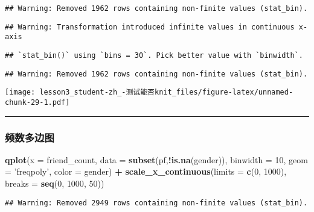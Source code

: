 \documentclass[]{article}
\newenvironment{Shaded}{\begin{snugshade}}{\end{snugshade}}
\newcommand{\DataTypeTok}[1]{\textcolor[rgb]{0.13,0.29,0.53}{#1}}
\newcommand{\DecValTok}[1]{\textcolor[rgb]{0.00,0.00,0.81}{#1}}
\newcommand{\KeywordTok}[1]{\textcolor[rgb]{0.13,0.29,0.53}{\textbf{#1}}}
\newcommand{\NormalTok}[1]{#1}
\newcommand{\OperatorTok}[1]{\textcolor[rgb]{0.81,0.36,0.00}{\textbf{#1}}}
\newcommand{\StringTok}[1]{\textcolor[rgb]{0.31,0.60,0.02}{#1}}
\begin{document}
\begin{verbatim}
## Warning: Removed 1962 rows containing non-finite values (stat_bin).
\end{verbatim}

\begin{verbatim}
## Warning: Transformation introduced infinite values in continuous x-axis
\end{verbatim}

\begin{verbatim}
## `stat_bin()` using `bins = 30`. Pick better value with `binwidth`.
\end{verbatim}

\begin{verbatim}
## Warning: Removed 1962 rows containing non-finite values (stat_bin).
\end{verbatim}

\texttt{[image: lesson3\_student-zh\_-测试能否knit\_files/figure-latex/unnamed-chunk-29-1.pdf]}

\begin{center}\rule{0.5\linewidth}{\linethickness}\end{center}

\subsubsection{频数多边图}

\begin{Shaded}
\begin{Highlighting}[]
\KeywordTok{qplot}\NormalTok{(}\DataTypeTok{x =}\NormalTok{ friend_count, }\DataTypeTok{data =} \KeywordTok{subset}\NormalTok{(pf,}\OperatorTok{!}\KeywordTok{is.na}\NormalTok{(gender)), }\DataTypeTok{binwidth =} \DecValTok{10}\NormalTok{,}
      \DataTypeTok{geom =} \StringTok{'freqpoly'}\NormalTok{, }\DataTypeTok{color =}\NormalTok{ gender) }\OperatorTok{+}
\StringTok{  }\KeywordTok{scale_x_continuous}\NormalTok{(}\DataTypeTok{limits =} \KeywordTok{c}\NormalTok{(}\DecValTok{0}\NormalTok{, }\DecValTok{1000}\NormalTok{), }\DataTypeTok{breaks =} \KeywordTok{seq}\NormalTok{(}\DecValTok{0}\NormalTok{, }\DecValTok{1000}\NormalTok{, }\DecValTok{50}\NormalTok{))}
\end{Highlighting}
\end{Shaded}

\begin{verbatim}
## Warning: Removed 2949 rows containing non-finite values (stat_bin).
\end{verbatim}
\end{document}
